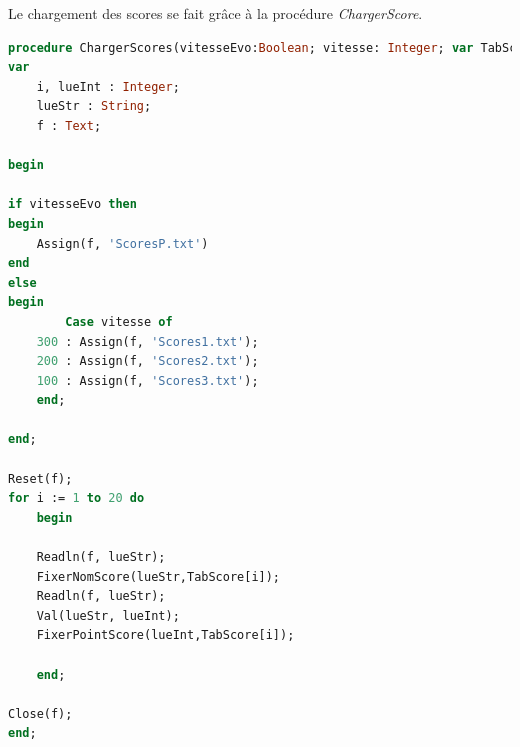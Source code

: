 \documentclass[11pt,a4paper]{article}
\begin{document}
        Le chargement des scores se fait grâce à la procédure \textit{ChargerScore}. 
        \scriptsize
        \begin{lstlisting}[language=Pascal,frame=single,caption=Code source de la procédure ChargerScore]
procedure ChargerScores(vitesseEvo:Boolean; vitesse: Integer; var TabScore:TableauDeScore);
var 
	i, lueInt : Integer;
	lueStr : String;
	f : Text;
	
begin

if vitesseEvo then
begin
    Assign(f, 'ScoresP.txt')
end
else
begin
        Case vitesse of 
	300 : Assign(f, 'Scores1.txt');
	200 : Assign(f, 'Scores2.txt');
	100 : Assign(f, 'Scores3.txt');
	end;

end;

Reset(f);
for i := 1 to 20 do
	begin
	
	Readln(f, lueStr);
	FixerNomScore(lueStr,TabScore[i]);	
	Readln(f, lueStr);
	Val(lueStr, lueInt);
	FixerPointScore(lueInt,TabScore[i]);
	
	end;
	
Close(f);
end;
        \end{lstlisting} 
\end{document}
